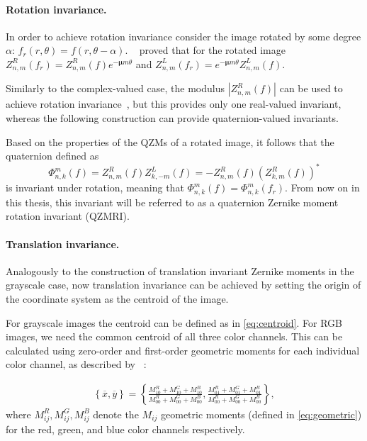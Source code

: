 \paragraph{Rotation invariance.}
In order to achieve rotation invariance consider the image rotated by some degree $\alpha$: $f_{r}(r,\theta) = f(r, \theta - \alpha)$. \citeauthor{qzmi}~\cite{qzmi} proved that for the rotated image $Z_{n,m}^R(f_{r}) = Z_{n,m}^R(f)e^{-\bm{\mu}m\theta}$ and $Z_{n,m}^L(f_{r}) = e^{-\bm{\mu}m\theta}Z_{n,m}^L(f)$. 


Similarly to the complex-valued case, the modulus $|Z_{n,m}^R(f)|$ can be used to achieve rotation invariance~\cite{qzm}, but this provides only one real-valued invariant, whereas the following construction can provide quaternion-valued invariants. 


Based on the properties of the QZMs of a rotated image, it follows that the quaternion defined as
$$\Phi_{n,k}^m(f) = Z_{n,m}^R(f)Z_{k,-m}^L(f) = -Z_{n,m}^R(f)(Z_{k,m}^R(f))^*$$
is invariant under rotation, meaning that $\Phi_{n,k}^m(f) = \Phi_{n,k}^m(f_{r})$.
From now on in this thesis, this invariant will be referred to as a quaternion Zernike moment rotation invariant (QZMRI).

\paragraph{Translation invariance.}
Analogously to the construction of translation invariant Zernike moments in the grayscale case, now translation invariance can be achieved by setting the origin of the coordinate system as the centroid of the image.


For grayscale images the centroid can be defined as in \eqref{eq:centroid}. For RGB images, we need the common centroid of all three color channels. This can be calculated using zero-order and first-order geometric moments for each individual color channel, as described by \citeauthor{affine_color}~\cite{affine_color}:

\begin{gather*}
    \left\{\overline{x}, \overline{y}\right\} = \left\{\frac{M_{10}^R + M_{10}^G + M_{10}^B}{M_{00}^R + M_{00}^G + M_{00}^B}, \frac{M_{01}^R + M_{01}^G + M_{01}^B}{M_{00}^R + M_{00}^G + M_{00}^B} \right\},
\end{gather*}
where $M_{ij}^R, M_{ij}^G, M_{ij}^B$ denote the $M_{ij}$ geometric moments (defined in \eqref{eq:geometric}) for the red, green, and blue color channels respectively.


